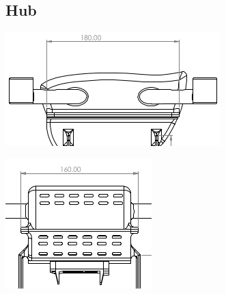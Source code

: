 \documentclass[12pt]{report}
\begin{document}
      
      \subsection*{Hub}
      \noindent
      \begin{minipage}{0.3\textwidth}
    \centering
    \includegraphics[width=\linewidth]{hub1.png}
\end{minipage}%
\hfill %
\begin{minipage}{0.3\textwidth}
    \centering
    \includegraphics[width=\linewidth]{hub3.png}
\end{minipage}%
\hfill %
\end{document}
